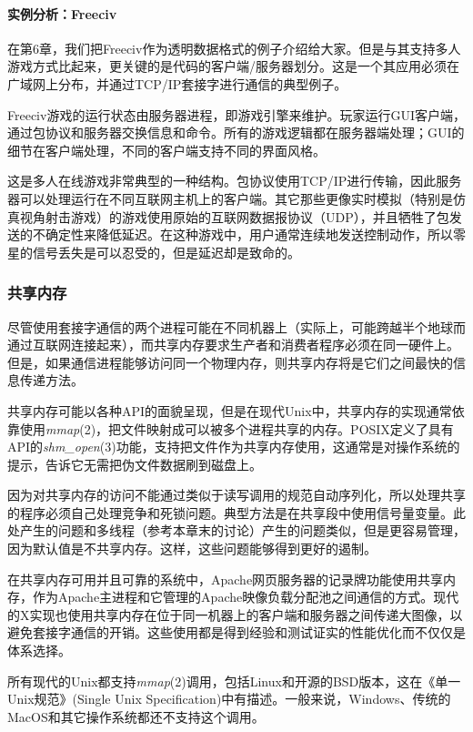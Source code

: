 \documentclass[12pt,oneside]{book}
\begin{document}
\begin{common-format}
\paragraph{实例分析：Freeciv}
在第6章，我们把Freeciv作为透明数据格式的例子介绍给大家。但是与其支持多人游戏方式比起来，更关键的是代码的客户端/服务器划分。这是一个其应用必须在广域网上分布，并通过TCP/IP套接字进行通信的典型例子。

Freeciv游戏的运行状态由服务器进程，即游戏引擎来维护。玩家运行GUI客户端，通过包协议和服务器交换信息和命令。所有的游戏逻辑都在服务器端处理；GUI的细节在客户端处理，不同的客户端支持不同的界面风格。

这是多人在线游戏非常典型的一种结构。包协议使用TCP/IP进行传输，因此服务器可以处理运行在不同互联网主机上的客户端。其它那些更像实时模拟（特别是仿真视角射击游戏）的游戏使用原始的互联网数据报协议（UDP），并且牺牲了包发送的不确定性来降低延迟。在这种游戏中，用户通常连续地发送控制动作，所以零星的信号丢失是可以忍受的，但是延迟却是致命的。


\subsubsection{共享内存}
尽管使用套接字通信的两个进程可能在不同机器上（实际上，可能跨越半个地球而通过互联网连接起来），而共享内存要求生产者和消费者程序必须在同一硬件上。但是，如果通信进程能够访问同一个物理内存，则共享内存将是它们之间最快的信息传递方法。

共享内存可能以各种API的面貌呈现，但是在现代Unix中，共享内存的实现通常依靠使用\textit{mmap}(2)，把文件映射成可以被多个进程共享的内存。POSIX定义了具有API的\textit{shm\_{}open}(3)功能，支持把文件作为共享内存使用，这通常是对操作系统的提示，告诉它无需把伪文件数据刷到磁盘上。

因为对共享内存的访问不能通过类似于读写调用的规范自动序列化，所以处理共享的程序必须自己处理竞争和死锁问题。典型方法是在共享段中使用信号量变量。此处产生的问题和多线程（参考本章末的讨论）产生的问题类似，但是更容易管理，因为默认值是不共享内存。这样，这些问题能够得到更好的遏制。

在共享内存可用并且可靠的系统中，Apache网页服务器的记录牌功能使用共享内存，作为Apache主进程和它管理的Apache映像负载分配池之间通信的方式。现代的X实现也使用共享内存在位于同一机器上的客户端和服务器之间传递大图像，以避免套接字通信的开销。这些使用都是得到经验和测试证实的性能优化而不仅仅是体系选择。

所有现代的Unix都支持\textit{mmap}(2)调用，包括Linux和开源的BSD版本，这在《单一Unix规范》(Single Unix Specification)中有描述。一般来说，Windows、传统的MacOS和其它操作系统都还不支持这个调用。


\end{common-format}
\end{document}
